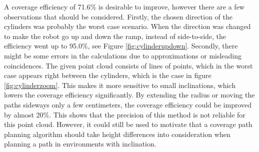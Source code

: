 A coverage efficiency of 71.6\% is desirable to improve, however there are a few observations that should be considered. Firstly, the chosen direction of the cylinders was probably the worst case scenario. When the direction was changed to make the robot go up and down the ramp, instead of side-to-side, the efficiency went up to 95.0\%, see Figure \ref{fig:cylinderupdown}. Secondly, there might be some errors in the calculations due to approximations or misleading coincidences. The given point cloud consists of lines of points, which in the worst case appears right between the cylinders, which is the case in figure \ref{fig:cylinderzoom}. This makes it more sensitive to small inclinations, which lowers the coverage efficiency significantly. By extending the radius or moving the paths sideways only a few centimeters, the coverage efficiency could be improved by almost 20\%. This shows that the precision of this method is not reliable for this point cloud. However, it could still be used to motivate that a coverage path planning algorithm should take height differences into consideration when planning a path in environments with inclination.


